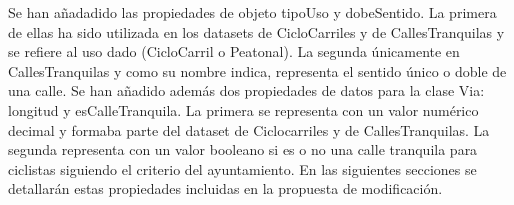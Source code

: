 Se han añadadido las propiedades de objeto tipoUso y dobeSentido. La primera de ellas ha sido utilizada en los datasets de CicloCarriles y de CallesTranquilas y se refiere al uso dado (CicloCarril o Peatonal). La segunda únicamente en CallesTranquilas y como su nombre indica, representa el sentido único o doble de una calle.\newline
Se han añadido además dos propiedades de datos para la clase Via: longitud y esCalleTranquila. La primera se representa con un valor numérico decimal y formaba parte del dataset de Ciclocarriles y de CallesTranquilas. La segunda representa con un valor booleano si es o no una calle tranquila para ciclistas siguiendo el criterio del ayuntamiento.\newline
En las siguientes secciones se detallarán estas propiedades incluidas en la propuesta de modificación.


